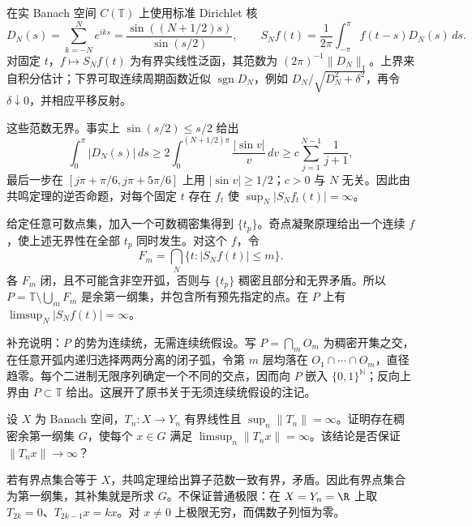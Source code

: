\begin{example}\label{ex:y2-fourier-divergence}
在实 Banach 空间 $C(\mathbb T)$ 上使用标准 Dirichlet 核
\[
 D_N(s)=\sum_{k=-N}^Ne^{iks}
 =\frac{\sin((N+1/2)s)}{\sin(s/2)},\qquad
 S_Nf(t)=\frac1{2\pi}\int_{-\pi}^{\pi}f(t-s)D_N(s)\,ds.
\]
对固定 $t$，$f\mapsto S_Nf(t)$ 为有界实线性泛函，其范数为 $(2\pi)^{-1}\|D_N\|_1$。上界来自积分估计；下界可取连续周期函数近似 $\operatorname{sgn}D_N$，例如 $D_N/\sqrt{D_N^2+\delta^2}$，再令 $\delta\downarrow0$，并相应平移反射。

这些范数无界。事实上 $\sin(s/2)\le s/2$ 给出
\[
 \int_0^\pi|D_N(s)|\,ds
 \ge2\int_0^{(N+1/2)\pi}\frac{|\sin v|}{v}\,dv
 \ge c\sum_{j=1}^{N-1}\frac1{j+1},
\]
最后一步在 $[j\pi+\pi/6,j\pi+5\pi/6]$ 上用 $|\sin v|\ge1/2$；$c>0$ 与 $N$ 无关。因此由共鸣定理的逆否命题，对每个固定 $t$ 存在 $f_t$ 使 $\sup_N|S_Nf_t(t)|=\infty$。

给定任意可数点集，加入一个可数稠密集得到 $\{t_p\}$。奇点凝聚原理给出一个连续 $f$，使上述无界性在全部 $t_p$ 同时发生。对这个 $f$，令
\[
 F_m=\bigcap_N\{t:|S_Nf(t)|\le m\}.
\]
各 $F_m$ 闭，且不可能含非空开弧，否则与 $\{t_p\}$ 稠密且部分和无界矛盾。所以 $P=\mathbb T\setminus\bigcup_mF_m$ 是余第一纲集，并包含所有预先指定的点。在 $P$ 上有 $\limsup_N|S_Nf(t)|=\infty$。

补充说明：$P$ 的势为连续统，无需连续统假设。写 $P=\bigcap_mO_m$ 为稠密开集之交，在任意开弧内递归选择两两分离的闭子弧，令第 $m$ 层均落在 $O_1\cap\cdots\cap O_m$，直径趋零。每个二进制无限序列确定一个不同的交点，因而向 $P$ 嵌入 $\{0,1\}^{\mathbb N}$；反向上界由 $P\subset\mathbb T$ 给出。这展开了原书关于无须连续统假设的注记。
\end{example}

\begin{exercise}
设 $X$ 为 Banach 空间，$T_n:X\to Y_n$ 有界线性且 $\sup_n\|T_n\|=\infty$。证明存在稠密余第一纲集 $G$，使每个 $x\in G$ 满足 $\limsup_n\|T_nx\|=\infty$。该结论是否保证 $\|T_nx\|\to\infty$？
\end{exercise}
\begin{solution}
若有界点集合等于 $X$，共鸣定理给出算子范数一致有界，矛盾。因此有界点集合为第一纲集，其补集就是所求 $G$。不保证普通极限：在 $X=Y_n=\R$ 上取 $T_{2k}=0$、$T_{2k-1}x=kx$。对 $x\ne0$ 上极限无穷，而偶数子列恒为零。
\end{solution}

